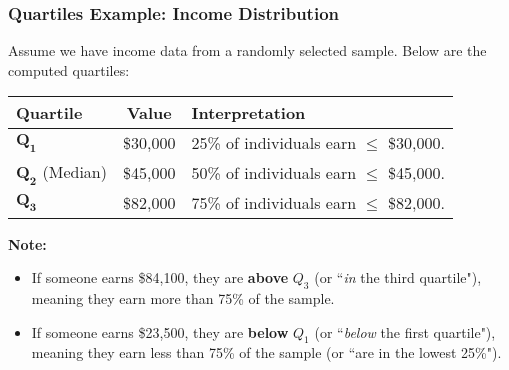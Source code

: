 \documentclass[handout]{beamer} %
\begin{document}
\begin{frame}
\frametitle{Quartiles Example: Income Distribution}

Assume we have income data from a randomly selected sample. Below are the computed quartiles:

\vspace{1em}

{\centering
\begin{tabular}{|l|c|p{6cm}|}
\hline
\textbf{Quartile} & \textbf{Value} & \textbf{Interpretation} \\
\hline
\(\mathbf{Q_1}\)      & \$30{,}000 & 25\% of individuals earn \(\le\) \$30{,}000. \\
\(\mathbf{Q_2}\) (Median) & \$45{,}000 & 50\% of individuals earn \(\le\) \$45{,}000. \\
\(\mathbf{Q_3}\)      & \$82{,}000 & 75\% of individuals earn \(\le\) \$82{,}000. \\
\hline
\end{tabular}
\par
}
\vspace{1em} \pause %
\textbf{Note:}
\begin{itemize}
    \item If someone earns \$84{,}100, they are \textbf{above} \(Q_3\) (or ``\emph{in} the third quartile"), meaning they earn more than 75\% of the sample.
    \item If someone earns \$23{,}500, they are \textbf{below} \(Q_1\) (or ``\emph{below} the first quartile"), meaning they earn less than 75\% of the sample (or ``are in the lowest 25\%").
\end{itemize}


\end{frame}
\end{document}
